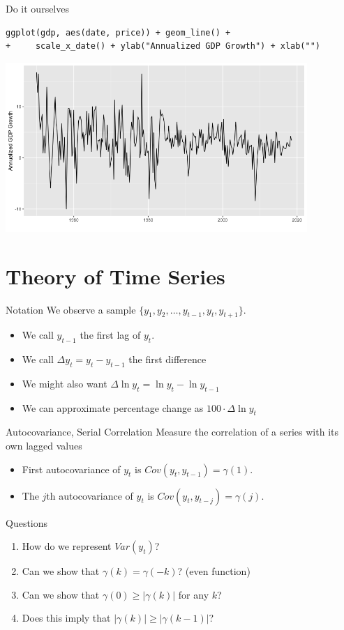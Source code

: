 \documentclass[aspectratio=169]{beamer}
\begin{document}
\begin{frame}[fragile]{Do it ourselves}
\begin{verbatim}
ggplot(gdp, aes(date, price)) + geom_line() +
+     scale_x_date() + ylab("Annualized GDP Growth") + xlab("")
\end{verbatim}
\begin{center}
\includegraphics[width=4.5in]{./resources/gdp_plot.png}
\end{center}
\end{frame}





\section{Theory of Time Series}

\begin{frame}{Notation}
We observe a sample $\{y_1,y_2,\ldots,y_{t-1},y_{t},y_{t+1}\}$.
\begin{itemize}
\item We call $y_{t-1}$ the \alert{first lag} of $y_t$.
\item We call $\Delta y_{t} = y_{t} - y_{t-1}$ the \alert{first difference}
\item We might also want $\Delta \ln y_{t} = \ln y_{t} - \ln y_{t-1}$
\item We can approximate percentage change as  $100 \cdot \Delta \ln y_{t}$
\end{itemize}
\end{frame}

\begin{frame}{Autocovariance, Serial Correlation}
Measure the correlation of a series with its own lagged values
\begin{itemize}
\item First \alert{autocovariance} of $y_t$ is $Cov(y_t,y_{t-1}) = \gamma(1)$.
\item The $j$th autocovariance of $y_t$ is $Cov(y_t,y_{t-j})=\gamma(j)$.
\end{itemize}
Questions
\begin{enumerate}
\item How do we represent $Var(y_t)$?
\item Can we show that $\gamma(k) = \gamma(-k)$? (even function)
\item Can we show that $\gamma(0) \geq |\gamma(k)|$ for any $k$?
\item Does this imply that $|\gamma(k)| \geq | \gamma(k-1)|$?
\end{enumerate}
\end{frame}
\end{document}
